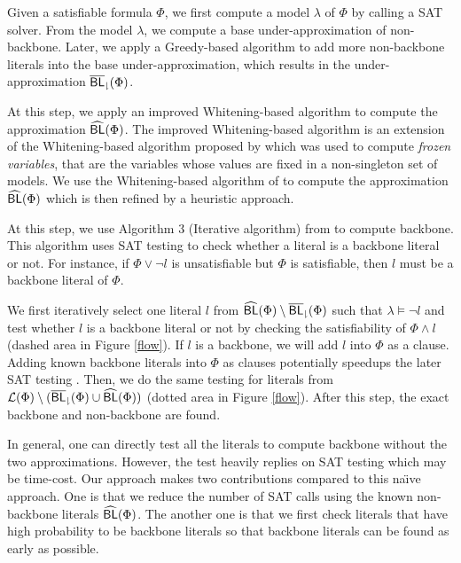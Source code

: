 \medskip
{}
Given a satisfiable formula $\Phi$, we first compute a model $\lambda$ of $\Phi$ by calling a SAT solver.
From the model $\lambda$, we compute a base under-approximation of non-backbone.
Later, we apply a Greedy-based algorithm to add more non-backbone literals into the base under-approximation, which results in the
under-approximation ${\sf \overline{BL}_\downharpoonright}(\Phi)$.



\medskip
{}
At this step, we apply an improved Whitening-based algorithm to compute the approximation ${\sf \widehat{BL}}(\Phi)$.
The improved Whitening-based algorithm is an extension of the Whitening-based algorithm proposed by \cite{LMZ09} which
was used to compute \emph{frozen variables}, that are the variables whose values are fixed in a non-singleton set of models.
We use the Whitening-based algorithm of \cite{LMZ09} to compute the approximation ${\sf \widehat{BL}}(\Phi)$ which is then refined by
a heuristic approach.


\medskip
{}
At this step, we use Algorithm 3 (Iterative algorithm) from \cite{JLM15} to compute backbone.
This algorithm uses SAT testing to check whether a literal is a backbone literal or not.
For instance, if $\Phi\vee \neg l$ is unsatisfiable but $\Phi$ is satisfiable, then $l$ must be a backbone literal of $\Phi$.


We first iteratively select one literal $l$ from ${\sf \widehat{BL}}(\Phi)\setminus {\sf \overline{BL}_\downharpoonright}(\Phi)$ such that $\lambda \models \neg l$ and test whether
$l$ is a backbone literal or not by checking the satisfiability of $\Phi\wedge l$ (dashed area in Figure \ref{flow}).
If $l$ is a backbone, we will add $l$ into $\Phi$ as a clause. Adding known backbone literals into $\Phi$ as clauses potentially speedups the later SAT testing \cite{JLM15,MPA2015}.
Then, we do the same testing for literals from ${\cal L}(\Phi)\setminus ({\sf \overline{BL}_\downharpoonright}(\Phi)\cup{\sf \widehat{BL}}(\Phi))$ (dotted area in Figure \ref{flow}).
After this step, the exact backbone and non-backbone are found.  


In general, one can directly test all the literals to compute backbone without the two approximations. 
However, the test heavily replies on SAT testing which may be time-cost. 
Our approach makes two contributions compared to this na\"{\i}ve approach. 
One is that we reduce the number of SAT calls using the known non-backbone literals ${\sf \widehat{BL}}(\Phi)$.
The another one is that we first check literals that have high probability to be backbone literals so that backbone literals can be found as early as possible.
 


